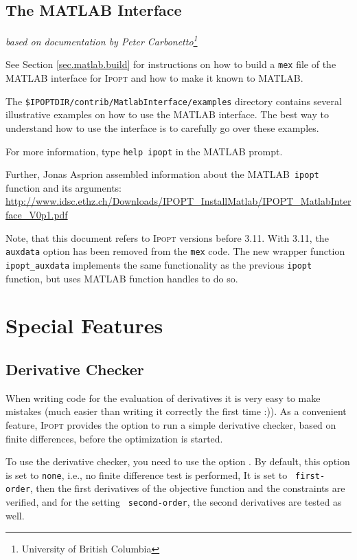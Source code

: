 \documentclass[10pt]{article}
\newcommand{\Ipopt}{\textsc{Ipopt}\xspace}
\newcommand{\Matlab}{\textsc{MATLAB}\xspace}
\begin{document}
\subsection{The \Matlab Interface} 
\hfill \textit{based on documentation by Peter Carbonetto\footnote{University of British Columbia}}%
\medskip

See Section \ref{sec.matlab.build} for instructions on how to build a
{\tt mex} file of the \Matlab interface for \Ipopt and how to make it known to 
\Matlab.

The {\tt \$IPOPTDIR/contrib/MatlabInterface/examples} directory contains 
several illustrative examples on how to use the \Matlab interface.
The best way to understand how to use the interface is to carefully go over 
these examples.

For more information, type {\tt help ipopt} in the \Matlab prompt.

Further, Jonas Asprion assembled information about the \Matlab\ {\tt ipopt} 
function and its arguments: 
\url{http://www.idsc.ethz.ch/Downloads/IPOPT_InstallMatlab/IPOPT_MatlabInterface_V0p1.pdf}

Note, that this document refers to \Ipopt versions before 3.11.
With 3.11, the {\tt auxdata} option has been removed from the {\tt mex} code. The new wrapper function {\tt ipopt\_auxdata} implements the same functionality as the previous {\tt ipopt} function, but uses \Matlab function handles to do so.

\section{Special Features}
\subsection{Derivative Checker}\label{sec:deriv-checker}
When writing code for the evaluation of derivatives it is very easy to
make mistakes (much easier than writing it correctly the first time
:)).  As a convenient feature, \Ipopt provides the option to run a
simple derivative checker, based on finite differences, before the
optimization is started.

To use the derivative checker, you need to use the option
.
By default, this option is set to {\tt none},
i.e., no finite difference test is performed,  It is set to {\tt
  first-order}, then the first derivatives of the objective function
and the constraints are verified, and for the setting {\tt
  second-order}, the second derivatives are tested as well.
\end{document}
